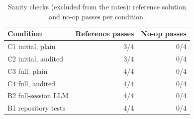 \begin{table}[t]\centering\footnotesize
\caption{Sanity checks (excluded from the rates): reference solution and no-op passes per condition.}\label{tab:sanity}
\begin{tabular}{lrr}\toprule Condition & Reference passes & No-op passes \\\midrule
C1 initial, plain & 3/4 & 0/4 \\
C2 initial, audited & 3/4 & 0/4 \\
C3 full, plain & 4/4 & 0/4 \\
C4 full, audited & 4/4 & 0/4 \\
B2 full-session LLM & 4/4 & 0/4 \\
B1 repository tests & 4/4 & 0/4 \\
\bottomrule\end{tabular}\end{table}
